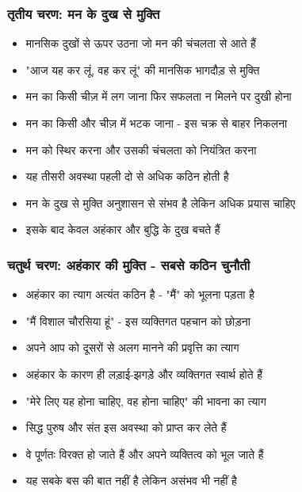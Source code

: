 \begin{frame}[fragile]\frametitle{तृतीय चरण: मन के दुख से मुक्ति}
      \begin{itemize}
          \item मानसिक दुखों से ऊपर उठना जो मन की चंचलता से आते हैं
          \item "आज यह कर लूं, वह कर लूं" की मानसिक भागदौड़ से मुक्ति
          \item मन का किसी चीज़ में लग जाना फिर सफलता न मिलने पर दुखी होना
          \item मन का किसी और चीज़ में भटक जाना - इस चक्र से बाहर निकलना
          \item मन को स्थिर करना और उसकी चंचलता को नियंत्रित करना
          \item यह तीसरी अवस्था पहली दो से अधिक कठिन होती है
          \item मन के दुख से मुक्ति अनुशासन से संभव है लेकिन अधिक प्रयास चाहिए
          \item इसके बाद केवल अहंकार और बुद्धि के दुख बचते हैं
      \end{itemize}
\end{frame}

\begin{frame}[fragile]\frametitle{चतुर्थ चरण: अहंकार की मुक्ति - सबसे कठिन चुनौती}
      \begin{itemize}
          \item अहंकार का त्याग अत्यंत कठिन है - "मैं" को भूलना पड़ता है
          \item "मैं विशाल चौरसिया हूं" - इस व्यक्तिगत पहचान को छोड़ना
          \item अपने आप को दूसरों से अलग मानने की प्रवृत्ति का त्याग
          \item अहंकार के कारण ही लड़ाई-झगड़े और व्यक्तिगत स्वार्थ होते हैं
          \item "मेरे लिए यह होना चाहिए, वह होना चाहिए" की भावना का त्याग
          \item सिद्ध पुरुष और संत इस अवस्था को प्राप्त कर लेते हैं
          \item वे पूर्णतः विरक्त हो जाते हैं और अपने व्यक्तित्व को भूल जाते हैं
          \item यह सबके बस की बात नहीं है लेकिन असंभव भी नहीं है
      \end{itemize}
\end{frame}

